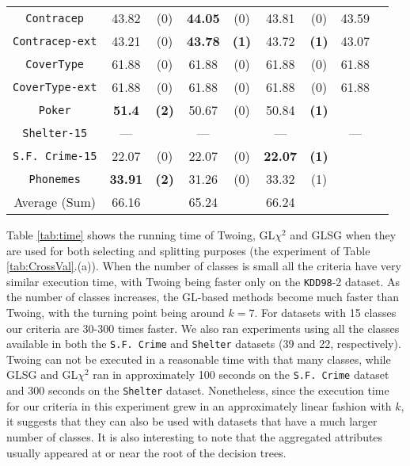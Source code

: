 \begin{table}
\begin{tabular}{c|cc|cc|cc|cc}
{\tt Contracep}     &43.82       &  (0)              &   {\bf 44.05}& (0)             &  43.81      &  (0)                 & 43.59       &                \\
{\tt Contracep-ext} &43.21       &  (0)              &   {\bf 43.78}& {\bf (1)}       &  43.72      &  {\bf (1)}           & 43.07       &                \\
{\tt CoverType}     &61.88       &  (0)              &   61.88      & (0)             &  61.88      &  (0)                 & 61.88       &                \\
{\tt CoverType-ext} &61.88       &  (0)              &   61.88      & (0)             &  61.88      &  (0)                 & 61.88       &                \\
{\tt Poker}         &{\bf 51.4}  &  {\bf (2)}        &   50.67      & (0)             &  50.84      &  {\bf (1)}           &             &                \\
{\tt Shelter-15}    &---         &                   &   ---        &                 &   ---       &                      & ---         &                \\
{\tt S.F. Crime-15} &22.07       &  (0)              &  22.07       & (0)             & {\bf 22.07} &  {\bf (1)}           &             &                \\
{\tt Phonemes}      & {\bf 33.91}&  {\bf (2)}        & 31.26        & (0)             &  33.32      &  (1)                 &             &                \\
\hline
Average (Sum)       & 66.16      &                   & 65.24        &                 &  66.24      &                      &             &
       \end{tabular}
\normalsize
\label{tab:CrossVal-b}
\end{table}


Table \ref{tab:time} shows the running time of Twoing, GL$\chi^2$ and GLSG  when
they are used for both selecting and splitting purposes (the experiment of Table \ref{tab:CrossVal}.(a)).
When the number of classes is small all the criteria have very similar execution time, with Twoing being faster only on the {\tt KDD98}-2 dataset. As the number of classes increases, the GL-based methods become much faster than Twoing, with the turning point being around $k=7$. For datasets with 15 classes our criteria are 30-300 times faster. We also ran experiments using all the classes available in both the {\tt S.F. Crime} and {\tt Shelter} datasets (39 and 22, respectively). Twoing can not be executed in a reasonable time with that many classes, while GLSG and GL$\chi^2$ ran in approximately 100 seconds on the {\tt S.F. Crime} dataset and  300 seconds on the {\tt Shelter} dataset. Nonetheless, since the execution time for our criteria in this experiment grew in an approximately linear fashion with $k$, it suggests that they can also be used with datasets that have a much larger number of classes. It is also interesting to note that the aggregated attributes usually appeared at or near the root of the decision trees.



